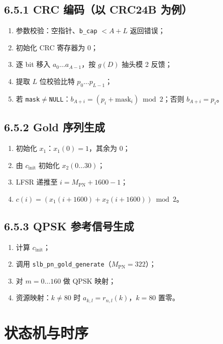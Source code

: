 \documentclass[11pt,a4paper]{ctexart}
\begin{document}
\subsection{6.5.1 CRC 编码（以 CRC24B 为例）}

\begin{enumerate}
  \item 参数校验：空指针、\texttt{b\_cap} $< A{+}L$ 返回错误；
  \item 初始化 CRC 寄存器为 0；
  \item 逐 bit 移入 $a_0\ldots a_{A-1}$，按 $g(D)$ 抽头模 2 反馈；
  \item 提取 $L$ 位校验比特 $p_0\ldots p_{L-1}$；
  \item 若 \texttt{mask}$\neq$\texttt{NULL}：$b_{A+i}=(p_i+\mathrm{mask}_i)\bmod 2$；否则 $b_{A+i}=p_i$。
\end{enumerate}

\subsection{6.5.2 Gold 序列生成}

\begin{enumerate}
  \item 初始化 $x_1$：$x_1(0){=}1$，其余为 0；
  \item 由 $c_{\mathrm{init}}$ 初始化 $x_2(0\ldots 30)$；
  \item LFSR 递推至 $i=M_{\mathrm{PN}}{+}1600{-}1$；
  \item $c(i)=(x_1(i{+}1600)+x_2(i{+}1600))\bmod 2$。
\end{enumerate}

\subsection{6.5.3 QPSK 参考信号生成}

\begin{enumerate}
  \item 计算 $c_{\mathrm{init}}$；
  \item 调用 \texttt{slb\_pn\_gold\_generate}（$M_{\mathrm{PN}}{=}322$）；
  \item 对 $m{=}0\ldots 160$ 做 QPSK 映射；
  \item 资源映射：$k{\neq}80$ 时 $a_{k,l}=r_{n,l}(k)$，$k{=}80$ 置零。
\end{enumerate}

\section{状态机与时序}
\end{document}
